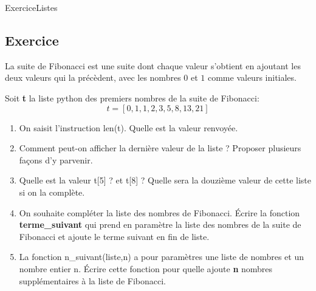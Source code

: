 \documentclass[11pt,a4paper]{article}
\newcounter{numexo}
\begin{document}
\begin{NSI}
{Exercice}{Listes}
\end{NSI}


\addtocounter{numexo}{1}
\subsection*{\Large Exercice \thenumexo}
La suite de Fibonacci est une suite dont chaque valeur s'obtient en ajoutant les deux valeurs qui la précèdent, avec les nombres $0$ et $1$ comme valeurs initiales.

Soit \textbf{t} la liste python des premiers nombres de la suite de Fibonacci: $$t=[0,1,1,2,3,5,8,13,21]$$

\begin{enumerate}
\item On saisit l'instruction \textsf{len(t)}. Quelle est la valeur renvoyée.
\item Comment peut-on afficher la dernière valeur de la liste ? Proposer plusieurs façons d'y parvenir.


%
\item Quelle est la valeur \textsf{t[5]} ? et \textsf{t[8]} ? Quelle sera la douzième valeur de cette liste si on la complète.

\item On souhaite compléter la liste des nombres de Fibonacci. Écrire la fonction \textbf{terme\_suivant} qui prend en paramètre la liste des nombres de la suite de Fibonacci et ajoute le terme suivant en fin de liste.

\item La fonction \textsf{n\_suivant(liste,n)} a pour paramètres une liste de nombres et un nombre entier \textsf{n}. Écrire cette fonction pour quelle ajoute \textbf{n} nombres supplémentaires à la liste de Fibonacci.
\end{enumerate}
\end{document}
